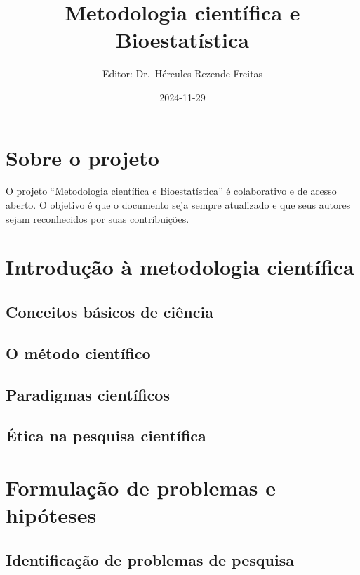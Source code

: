 \documentclass[
]{book}
\title{Metodologia científica e Bioestatística}
\author{Editor: Dr.~Hércules Rezende Freitas}
\date{2024-11-29}
\begin{document}
\maketitle

{
\setcounter{tocdepth}{1}
\tableofcontents
}
\chapter{Sobre o projeto}\label{sobre-o-projeto}

O projeto ``Metodologia científica e Bioestatística'' é colaborativo e de acesso aberto. O objetivo é que o documento seja sempre atualizado e que seus autores sejam reconhecidos por suas contribuições.

\chapter{Introdução à metodologia científica}\label{introduuxe7uxe3o-uxe0-metodologia-cientuxedfica}

\section{Conceitos básicos de ciência}\label{conceitos-buxe1sicos-de-ciuxeancia}

\section{O método científico}\label{o-muxe9todo-cientuxedfico}

\section{Paradigmas científicos}\label{paradigmas-cientuxedficos}

\section{Ética na pesquisa científica}\label{uxe9tica-na-pesquisa-cientuxedfica}

\chapter{Formulação de problemas e hipóteses}\label{formulauxe7uxe3o-de-problemas-e-hipuxf3teses}

\section{Identificação de problemas de pesquisa}\label{identificauxe7uxe3o-de-problemas-de-pesquisa}
\end{document}
